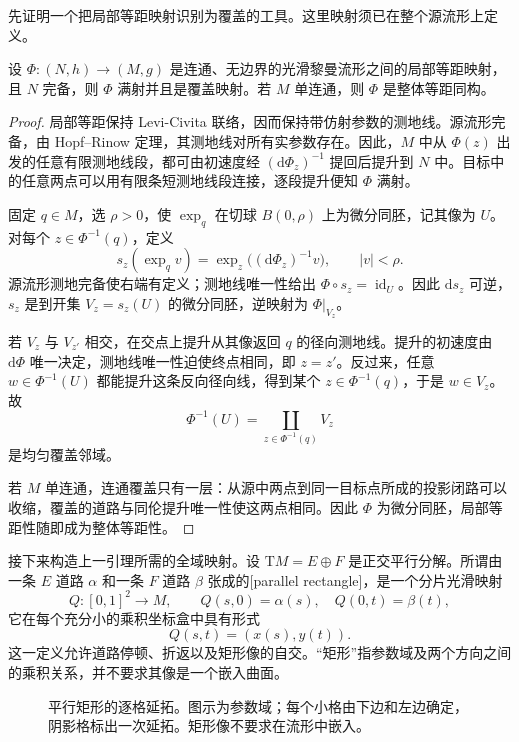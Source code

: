 先证明一个把局部等距映射识别为覆盖的工具。这里映射须已在整个源流形上定义。

\begin{lemma}\label{g3:lem:complete-local-isometry-covering}
	设 \(\Phi:(N,h)\to(M,g)\) 是连通、无边界的光滑黎曼流形之间的局部等距映射，且 \(N\) 完备，则 \(\Phi\) 满射并且是覆盖映射。若 \(M\) 单连通，则 \(\Phi\) 是整体等距同构。
\end{lemma}
\begin{proof}
	局部等距保持 Levi-Civita 联络，因而保持带仿射参数的测地线。源流形完备，由 Hopf--Rinow 定理，其测地线对所有实参数存在。因此，\(M\) 中从 \(\Phi(z)\) 出发的任意有限测地线段，都可由初速度经 \((\mathrm d\Phi_z)^{-1}\) 提回后提升到 \(N\) 中。目标中的任意两点可以用有限条短测地线段连接，逐段提升便知 \(\Phi\) 满射。

	固定 \(q\in M\)，选 \(\rho>0\)，使 \(\exp_q\) 在切球 \(B(0,\rho)\) 上为微分同胚，记其像为 \(U\)。对每个 \(z\in\Phi^{-1}(q)\)，定义
	\[
		s_z(\exp_q v)=\exp_z\bigl((\mathrm d\Phi_z)^{-1}v\bigr),
		\qquad |v|<\rho.
	\]
	源流形测地完备使右端有定义；测地线唯一性给出
	\(\Phi\circ s_z=\operatorname{id}_U\)。因此 \(\mathrm ds_z\) 可逆，\(s_z\) 是到开集 \(V_z=s_z(U)\) 的微分同胚，逆映射为 \(\Phi|_{V_z}\)。

	若 \(V_z\) 与 \(V_{z'}\) 相交，在交点上提升从其像返回 \(q\) 的径向测地线。提升的初速度由 \(\mathrm d\Phi\) 唯一决定，测地线唯一性迫使终点相同，即 \(z=z'\)。反过来，任意 \(w\in\Phi^{-1}(U)\) 都能提升这条反向径向线，得到某个 \(z\in\Phi^{-1}(q)\)，于是 \(w\in V_z\)。故
	\[
		\Phi^{-1}(U)=\coprod_{z\in\Phi^{-1}(q)}V_z
	\]
	是均匀覆盖邻域。

	若 \(M\) 单连通，连通覆盖只有一层：从源中两点到同一目标点所成的投影闭路可以收缩，覆盖的道路与同伦提升唯一性使这两点相同。因此 \(\Phi\) 为微分同胚，局部等距性随即成为整体等距性。
\end{proof}

接下来构造上一引理所需的全域映射。设
\(\mathrm{T}M=E\oplus F\) 是正交平行分解。所谓由一条 \(E\) 道路 \(\alpha\) 和一条 \(F\) 道路 \(\beta\) 张成的[parallel rectangle]，是一个分片光滑映射
\[
	Q:[0,1]^2\longrightarrow M,\qquad
	Q(s,0)=\alpha(s),\quad Q(0,t)=\beta(t),
\]
它在每个充分小的乘积坐标盒中具有形式
\[
	Q(s,t)=(x(s),y(t)).
\]
这一定义允许道路停顿、折返以及矩形像的自交。“矩形”指参数域及两个方向之间的乘积关系，并不要求其像是一个嵌入曲面。

\begin{figure}[htbp]
	\centering
	
	\caption[平行矩形的逐格延拓]{平行矩形的逐格延拓。图示为参数域；每个小格由下边和左边确定，阴影格标出一次延拓。矩形像不要求在流形中嵌入。}
	\label{g3:fig:parallel-product-rectangle}
\end{figure}


